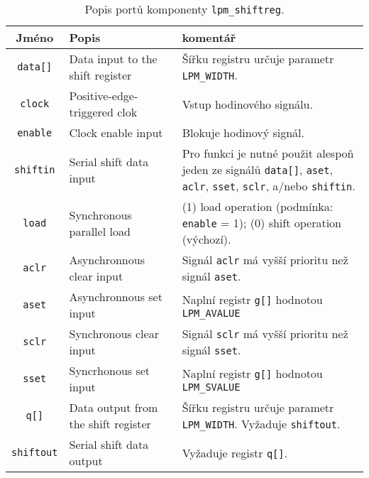 {    \begin{table*} 
      \centering
      \begin{tabular}{|c|p{3.5cm}|p{8cm}|}
        \hline
           \rowcolor{CornflowerBlue} {\textbf{Jméno}} & {\textbf{Popis}} & {\textbf{komentář}} \\
        \hline\hline       
           \texttt{data[]}   & Data input to the shift register    
                             & Šířku registru určuje parametr \texttt{LPM\_WIDTH}. \\
        \hline   
           \texttt{clock}    & Positive-edge-triggered clok        
                             & Vstup hodinového signálu. \\
        \hline     
           \texttt{enable}   & Clock enable input                  
                             & Blokuje hodinový signál. \\
        \hline      
           \texttt{shiftin}  & Serial shift data input             
                             & Pro funkci je nutné použit alespoň jeden ze signálů
                               \texttt{data[]}, \texttt{aset}, \texttt{aclr}, \texttt{sset}, 
                               \texttt{sclr}, a/nebo \texttt{shiftin}.  \\
        \hline    
           \texttt{load}     & Synchronous parallel load           
                             & (1) load operation (podmínka: \texttt{enable} = 1); (0) shift
                               operation (výchozí). \\
        \hline    
           \texttt{aclr}     & Asynchronnous clear input          
                             & Signál \texttt{aclr} má vyšší prioritu než signál
           \texttt{aset}.  \\
        \hline    
           \texttt{aset}     & Asynchronnous set input             
                             & Naplní registr \texttt{g[]} hodnotou \texttt{LPM\_AVALUE} \\
        \hline 
           \texttt{sclr}     & Synchronous clear input             
                             & Signál \texttt{sclr} má vyšší prioritu než signál
           \texttt{sset}.  \\
        \hline  
           \texttt{sset}     & Syncrhonous set input              
                             & Naplní registr \texttt{g[]} hodnotou \texttt{LPM\_SVALUE} \\
        \hline  
           \texttt{q[]}      & Data output from the shift register 
                             & Šířku registru určuje parametr \texttt{LPM\_WIDTH}. Vyžaduje
           \texttt{shiftout}.  \\
        \hline 
           \texttt{shiftout} & Serial shift data output          
                             & Vyžaduje registr \texttt{q[]}. \\
        \hline                                                           
      \end{tabular}
      \caption{Popis portů komponenty \texttt{lpm\_shiftreg}.}
      \label{VHDL:tab_lpm_shiftreg}       
    \end{table*}
    
}
